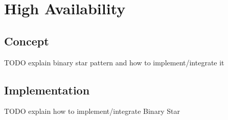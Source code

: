 \chapter{High Availability}\label{ch:ha}

\section{Concept}
TODO explain binary star pattern and how to implement/integrate it

\section{Implementation}
TODO explain how to implement/integrate Binary Star

